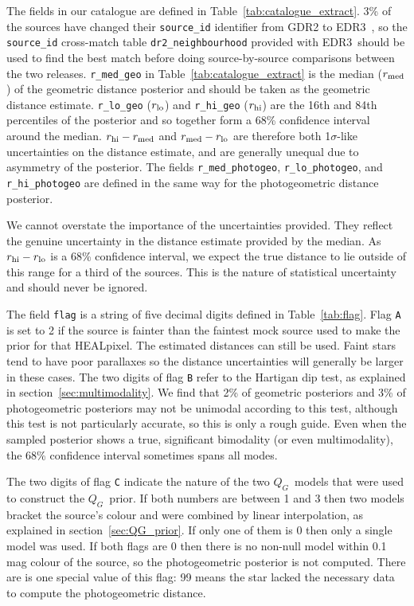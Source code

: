 \documentclass[twocolumn]{aastex62}
\providecommand{\gdr}[1]{GDR{#1}}
\providecommand{\release}{EDR3}
\providecommand{\QG}{\ensuremath{Q_G}}
\providecommand{\dist}{\ensuremath{r}}
\providecommand{\rlo}{\ensuremath{\dist_{\rm lo}}}
\providecommand{\rhi}{\ensuremath{\dist_{\rm hi}}}
\providecommand{\rmed}{\ensuremath{\dist_{\rm med}}}
\begin{document}
The fields in our catalogue are defined in Table~\ref{tab:catalogue_extract}.
3\% of the sources have changed their {\tt source\_id} identifier from  \gdr{2} to \release\ \citep{fabricius_etal_gedr3_validation}, so the {\tt source\_id} cross-match table {\tt dr2\_neighbourhood} provided with \release\ should be used to find the best match before doing source-by-source comparisons between the two releases.
{\tt r\_med\_geo} in Table~\ref{tab:catalogue_extract} is the median (\rmed) of the geometric distance posterior and should be taken as the geometric distance estimate. {\tt r\_lo\_geo} (\rlo) and {\tt r\_hi\_geo} (\rhi) are the 16th and 84th percentiles of the posterior and so together form a 68\% confidence interval around the median. $\rhi - \rmed$ and $\rmed - \rlo$ are therefore both 1$\sigma$-like uncertainties on the distance estimate, and are generally unequal due to asymmetry of the posterior.  
The fields {\tt r\_med\_photogeo}, {\tt r\_lo\_photogeo}, and {\tt r\_hi\_photogeo} are defined in the same way for the photogeometric distance posterior.

We cannot overstate the importance of the uncertainties provided. They reflect the genuine uncertainty in the distance estimate provided by the median. As $\rhi-\rlo$ is a 68\% confidence interval, we expect the true distance to lie outside of this range for a third of the sources. This is the nature of statistical uncertainty and should never be ignored.

The field {\tt flag} is a string of five decimal digits defined in Table~\ref{tab:flag}. 
Flag {\tt A} is set to 2 if the source is fainter than the faintest mock source used to make the prior for that HEALpixel. The estimated distances can still be used. Faint stars tend to have poor parallaxes so the distance uncertainties will generally be larger in these cases.
The two digits of flag {\tt B} refer to the Hartigan dip test, as explained in section~\ref{sec:multimodality}. 
We find that 2\% of geometric posteriors and 3\% of photogeometric posteriors may not be unimodal according to this test, although this test is not particularly accurate, so this is only a rough guide.
Even when the sampled posterior shows a true, significant bimodality (or even multimodality), the 68\% confidence interval sometimes spans all modes. 

The two digits of flag {\tt C} indicate the nature of the two \QG\ models that were used to construct the \QG\ prior. If both numbers are between 1 and 3 then two models bracket the source's colour and were combined by linear interpolation, as explained in section~\ref{sec:QG_prior}. If only one of them is 0 then only a single model was used. 
If both flags are 0 then there is no non-null model within 0.1\,mag  colour of the source, so the photogeometric posterior is not computed. 
There are is one special value of this flag: 
99 means the star lacked the necessary data to compute the photogeometric distance.
\end{document}
